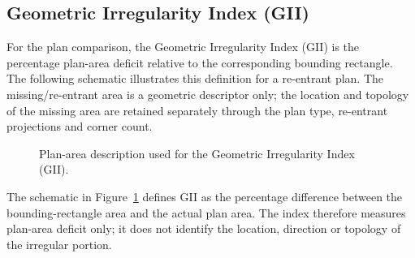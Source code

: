\subsection{Geometric Irregularity Index (GII)}
For the plan comparison, the Geometric Irregularity Index (GII) is the percentage plan-area deficit relative to the corresponding bounding rectangle. The following schematic illustrates this definition for a re-entrant plan. The missing/re-entrant area is a geometric descriptor only; the location and topology of the missing area are retained separately through the plan type, re-entrant projections and corner count.

\begin{figure}[!htbp]
\centering
{}
\caption{Plan-area description used for the Geometric Irregularity Index (GII).}
\label{fig:gii_definition}
\end{figure}

The schematic in Figure~\ref{fig:gii_definition} defines GII as the percentage difference between the bounding-rectangle area and the actual plan area. The index therefore measures plan-area deficit only; it does not identify the location, direction or topology of the irregular portion.


